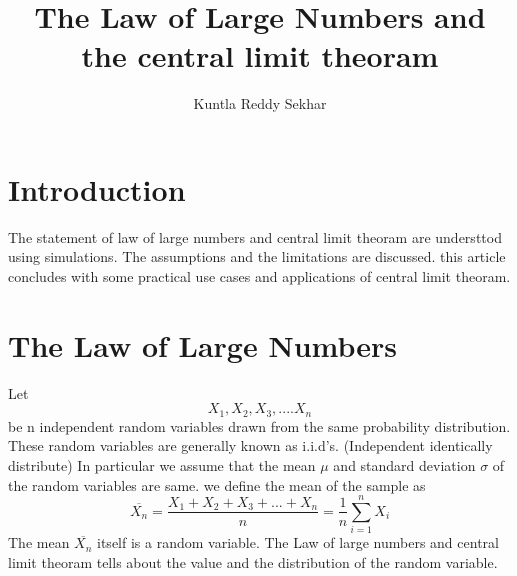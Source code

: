 \documentclass[12 pt]{article}
\begin{document}
\title{\textbf{The Law of Large Numbers and the central limit theoram}}
\author{Kuntla Reddy Sekhar}
\maketitle
\section{Introduction}
The statement of law of large numbers and central limit theoram
are understtod using simulations. The assumptions and the limitations are discussed.
this article concludes with some practical use cases
and applications of central limit theoram.

\section{The Law of Large Numbers}

Let \[X_1,X_2,X_3,....X_n\]  be n independent random variables
drawn from the same probability distribution. These
random variables are generally known as i.i.d's. (Independent identically distribute)
In particular we assume that the mean \(\mu\) and standard deviation
\(\sigma\) of the random variables are same.
we define the mean of the sample as 
\begin{equation}
    \overline{X_n}  = \frac{X_1+X_2+X_3+...+X_n}{n}
    = \frac{1}{n}\sum_{i = 1}^{n}  X_i
\end{equation}
The mean \(\overline{X_n} \) itself is a
random variable. The Law of large numbers and central limit
theoram tells about the value and the 
distribution of the random variable.
\end{document}
